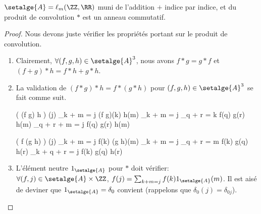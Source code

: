 
\begin{fact}
	$\setalge{A} = \ell_{\small m}(\ZZ , \RR)$
	muni de l'addition $+$ indice par indice, et du produit de convolution $\ast$
	est un anneau commutatif.
\end{fact}


\begin{proof}
	Nous devons juste vérifier les propriétés portant sur le produit de convolution.
	\begin{enumerate}
		\item Clairement,
		$\forall (f,g,h) \in \setalge{A}^3$, nous avons
		$f \ast g = g \ast f$
		et
		$(f + g) \ast h = f \ast h + g \ast h$.


		\item La validation de
		$(f \ast g) \ast h = f \ast (g \ast h)$
		pour
		$(f,g,h) \in \setalge{A}^3$
		se fait comme suit.

		\begin{multicols}{2}
        	\setlength{\columnseprule}{.75pt}
	
	
    		\begin{stepcalc}[style=ar*]
    			\big( (f \ast g) \ast h \big) (j)
    		\explnext{}
    			\dsum_{k + m = j} (f \ast g)(k) h(m)
    		\explnext{}
    			\dsum_{k + m = j} \dsum_{q + r = k} f(q) g(r) h(m)
    		\explnext{}
    			\dsum_{q + r + m = j} f(q) g(r) h(m)
    		\end{stepcalc}
	
	
    		\begin{stepcalc}[style=ar*]
    			\big( f \ast (g \ast h) \big) (j)
    		\explnext{}
    			\dsum_{k + m = j} f(k) (g \ast h)(m)
    		\explnext{}
    			\dsum_{k + m = j} \dsum_{q + r = m} f(k) g(q) h(r)
    		\explnext{}
    			\dsum_{k + q + r = j} f(k) g(q) h(r)
    		\end{stepcalc}
    	\end{multicols}


		\item L'élément neutre $1_{\setalge{A}}$ pour $\ast$ doit vérifier:
		$\forall (f, j) \in \setalge{A} \times \ZZ$,
		$f(j) = \sum_{k + m = j} f(k) 1_{\setalge{A}}(m)$.
		Il est aisé de deviner que $1_{\setalge{A}} = \delta_0$ convient
		(rappelons que $\delta_{0}(j) = \delta_{0j}$).
	\end{enumerate}

	\null\vspace{-6ex}
\end{proof}


